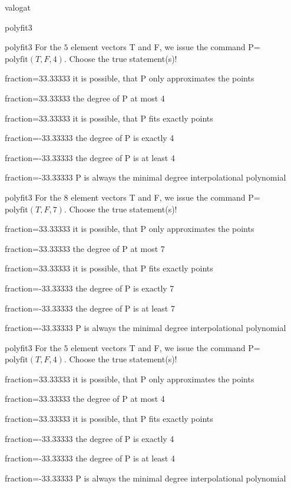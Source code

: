 \documentclass[12pt]{article}
\begin{document}
\begin{quiz}{valogat}
\begin{multi}[single=false]{polyfit3}
\end{multi}
\begin{multi}[single=false]{polyfit3}
For the $5$ element vectors T and F, we issue the command P=$\mathrm{polyfit}(T,F,4)$.
Choose the true statement(s)!
\item[fraction=33.33333] it is possible, that P only approximates the points
\item[fraction=33.33333] the degree of P at most 4
\item[fraction=33.33333] it is possible, that P fits exactly points
\item[fraction=-33.33333]  the degree of P is exactly 4
\item[fraction=-33.33333]  the degree of P is at least 4
\item[fraction=-33.33333]  P is always the minimal degree interpolational polynomial
\end{multi}
\begin{multi}[single=false]{polyfit3}
For the $8$ element vectors T and F, we issue the command P=$\mathrm{polyfit}(T,F,7)$.
Choose the true statement(s)!
\item[fraction=33.33333] it is possible, that P only approximates the points
\item[fraction=33.33333] the degree of P at most 7
\item[fraction=33.33333] it is possible, that P fits exactly points
\item[fraction=-33.33333]  the degree of P is exactly 7
\item[fraction=-33.33333]  the degree of P is at least 7
\item[fraction=-33.33333]  P is always the minimal degree interpolational polynomial
\end{multi}
\begin{multi}[single=false]{polyfit3}
For the $5$ element vectors T and F, we issue the command P=$\mathrm{polyfit}(T,F,4)$.
Choose the true statement(s)!
\item[fraction=33.33333] it is possible, that P only approximates the points
\item[fraction=33.33333] the degree of P at most 4
\item[fraction=33.33333] it is possible, that P fits exactly points
\item[fraction=-33.33333]  the degree of P is exactly 4
\item[fraction=-33.33333]  the degree of P is at least 4
\item[fraction=-33.33333]  P is always the minimal degree interpolational polynomial

\end{multi}
\end{quiz}
\end{document}
